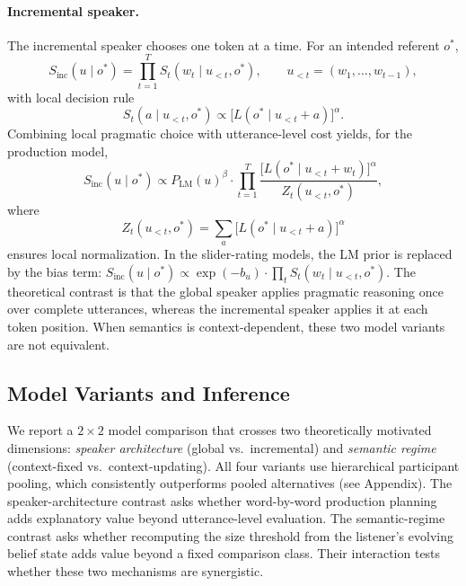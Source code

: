 \documentclass[man,floatsintext]{apa7}
\begin{document}
\paragraph{Incremental speaker.}
The incremental speaker chooses one token at a time. For an intended referent $o^\ast$,
\begin{equation}
  S_{\mathrm{inc}}(u \mid o^\ast)
  = \prod_{t=1}^{T} S_t\!\left(w_t \mid u_{<t}, o^\ast\right),
  \qquad u_{<t} = (w_1, \ldots, w_{t-1}),
  \label{eq:inc_chain}
\end{equation}
with local decision rule
\begin{equation}
  S_t(a \mid u_{<t}, o^\ast)
  \propto
  \bigl[L(o^\ast \mid u_{<t} + a)\bigr]^{\alpha}.
  \label{eq:inc_speaker}
\end{equation}
Combining local pragmatic choice with utterance-level cost yields, for the production model,
\begin{equation}
  S_{\mathrm{inc}}(u \mid o^\ast)
  \propto P_{\mathrm{LM}}(u)^{\beta}
  \cdot \prod_{t=1}^{T}
  \frac{\bigl[L(o^\ast \mid u_{<t} + w_t)\bigr]^{\alpha}}{Z_t(u_{<t}, o^\ast)},
  \label{eq:inc_full}
\end{equation}
where
\begin{equation}
  Z_t(u_{<t}, o^\ast)
  = \sum_{a} \bigl[L(o^\ast \mid u_{<t} + a)\bigr]^{\alpha}
  \label{eq:inc_normaliser}
\end{equation}
ensures local normalization.
In the slider-rating models, the LM prior is replaced by the bias term: $S_{\mathrm{inc}}(u \mid o^\ast) \propto \exp(-b_u) \cdot \prod_t S_t(w_t \mid u_{<t}, o^\ast)$.
The theoretical contrast is that the global speaker applies pragmatic reasoning once over complete utterances, whereas the incremental speaker applies it at each token position.
When semantics is context-dependent, these two model variants are not equivalent.

\subsection{Model Variants and Inference}
\label{sec:model:variants}

We report a $2 \times 2$ model comparison that crosses two theoretically motivated dimensions: \emph{speaker architecture} (global vs.\ incremental) and \emph{semantic regime} (context-fixed vs.\ context-updating).
All four variants use hierarchical participant pooling, which consistently outperforms pooled alternatives (see Appendix).
The speaker-architecture contrast asks whether word-by-word production planning adds explanatory value beyond utterance-level evaluation.
The semantic-regime contrast asks whether recomputing the size threshold from the listener's evolving belief state adds value beyond a fixed comparison class.
Their interaction tests whether these two mechanisms are synergistic.
\end{document}
